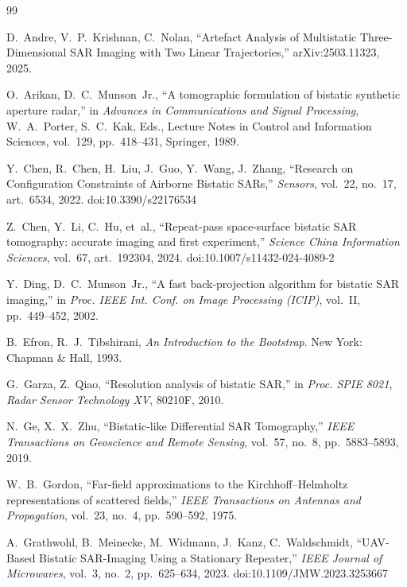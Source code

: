 \documentclass[11pt,a4paper]{report}
\begin{document}
\begin{thebibliography}{99}

 D.~Andre, V.~P.~Krishnan, C.~Nolan, ``Artefact Analysis of Multistatic Three-Dimensional SAR Imaging with Two Linear Trajectories,'' arXiv:2503.11323, 2025.

 O.~Arikan, D.~C.~Munson~Jr., ``A tomographic formulation of bistatic synthetic aperture radar,'' in \emph{Advances in Communications and Signal Processing}, W.~A.~Porter, S.~C.~Kak, Eds., Lecture Notes in Control and Information Sciences, vol.~129, pp.~418--431, Springer, 1989.

 Y.~Chen, R.~Chen, H.~Liu, J.~Guo, Y.~Wang, J.~Zhang, ``Research on Configuration Constraints of Airborne Bistatic SARs,'' \emph{Sensors}, vol.~22, no.~17, art.~6534, 2022. doi:10.3390/s22176534

 Z.~Chen, Y.~Li, C.~Hu, et~al., ``Repeat-pass space-surface bistatic SAR tomography: accurate imaging and first experiment,'' \emph{Science China Information Sciences}, vol.~67, art.~192304, 2024. doi:10.1007/s11432-024-4089-2

 Y.~Ding, D.~C.~Munson~Jr., ``A fast back-projection algorithm for bistatic SAR imaging,'' in \emph{Proc. IEEE Int. Conf. on Image Processing (ICIP)}, vol.~II, pp.~449--452, 2002.

 B.~Efron, R.~J.~Tibshirani, \emph{An Introduction to the Bootstrap}. New York: Chapman \& Hall, 1993.

 G.~Garza, Z.~Qiao, ``Resolution analysis of bistatic SAR,'' in \emph{Proc. SPIE 8021, Radar Sensor Technology XV}, 80210F, 2010.

 N.~Ge, X.~X.~Zhu, ``Bistatic-like Differential SAR Tomography,'' \emph{IEEE Transactions on Geoscience and Remote Sensing}, vol.~57, no.~8, pp.~5883--5893, 2019.

 W.~B.~Gordon, ``Far-field approximations to the Kirchhoff--Helmholtz representations of scattered fields,'' \emph{IEEE Transactions on Antennas and Propagation}, vol.~23, no.~4, pp.~590--592, 1975.

 A.~Grathwohl, B.~Meinecke, M.~Widmann, J.~Kanz, C.~Waldschmidt, ``UAV-Based Bistatic SAR-Imaging Using a Stationary Repeater,'' \emph{IEEE Journal of Microwaves}, vol.~3, no.~2, pp.~625--634, 2023. doi:10.1109/JMW.2023.3253667


\end{thebibliography}
\end{document}
